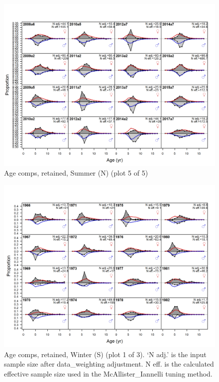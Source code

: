 \documentclass[12pt,]{article}
\begin{document}
\begin{figure}
\centering
\includegraphics{r4ss/plots_mod1/comp_agefit_flt2mkt2_page5.png}
\caption{Age comps, retained, Summer (N) (plot 5 of 5)
\label{fig:age_fits}}
\end{figure}

\begin{figure}
\centering
\includegraphics{r4ss/plots_mod1/comp_agefit_flt3mkt2_page1.png}
\caption{Age comps, retained, Winter (S) (plot 1 of 3). `N adj.' is the
input sample size after data\_weighting adjustment. N eff. is the
calculated effective sample size used in the McAllister\_Iannelli tuning
method. \label{fig:age_fits}}
\end{figure}
\end{document}
